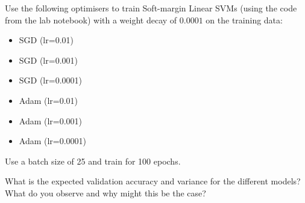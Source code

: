 \documentclass[a4paper]{article}
\begin{document}
\begin{tcolorbox}[title=2.1 Iris SVM (2 marks)]
Use the following optimisers to train Soft-margin Linear SVMs (using the code from the lab notebook) with a weight decay of $0.0001$ on the training data: 
\begin{itemize}
	\item SGD (lr=0.01)
	\item SGD (lr=0.001)
	\item SGD (lr=0.0001)
	\item Adam (lr=0.01)
	\item Adam (lr=0.001)
	\item Adam (lr=0.0001)
\end{itemize}
Use a batch size of 25 and train for 100 epochs.

What is the expected validation accuracy and variance for the different models? What do you observe and why might this be the case?
\end{tcolorbox}
\end{document}
